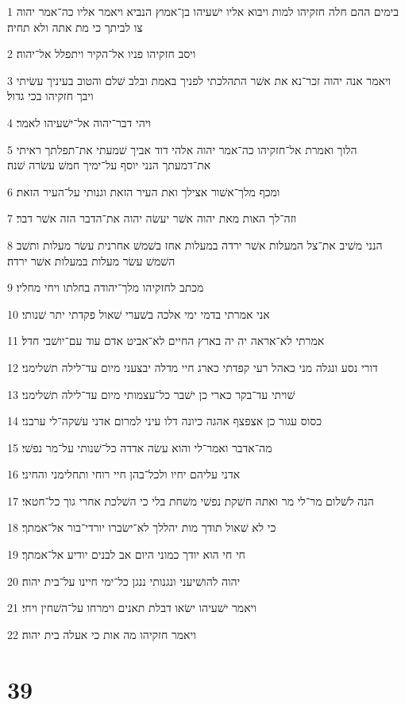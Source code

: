 \par 1 בימים ההם חלה חזקיהו למות ויבוא אליו ישׁעיהו בן־אמוץ הנביא ויאמר אליו כה־אמר יהוה צו לביתך כי מת אתה ולא תחיה׃
\par 2 ויסב חזקיהו פניו אל־הקיר ויתפלל אל־יהוה׃
\par 3 ויאמר אנה יהוה זכר־נא את אשׁר התהלכתי לפניך באמת ובלב שׁלם והטוב בעיניך עשׂיתי ויבך חזקיהו בכי גדול׃
\par 4 ויהי דבר־יהוה אל־ישׁעיהו לאמר׃
\par 5 הלוך ואמרת אל־חזקיהו כה־אמר יהוה אלהי דוד אביך שׁמעתי את־תפלתך ראיתי את־דמעתך הנני יוסף על־ימיך חמשׁ עשׂרה שׁנה׃
\par 6 ומכף מלך־אשׁור אצילך ואת העיר הזאת וגנותי על־העיר הזאת׃
\par 7 וזה־לך האות מאת יהוה אשׁר יעשׂה יהוה את־הדבר הזה אשׁר דבר׃
\par 8 הנני משׁיב את־צל המעלות אשׁר ירדה במעלות אחז בשׁמשׁ אחרנית עשׂר מעלות ותשׁב השׁמשׁ עשׂר מעלות במעלות אשׁר ירדה׃
\par 9 מכתב לחזקיהו מלך־יהודה בחלתו ויחי מחליו׃
\par 10 אני אמרתי בדמי ימי אלכה בשׁערי שׁאול פקדתי יתר שׁנותי׃
\par 11 אמרתי לא־אראה יה יה בארץ החיים לא־אביט אדם עוד עם־יושׁבי חדל׃
\par 12 דורי נסע ונגלה מני כאהל רעי קפדתי כארג חיי מדלה יבצעני מיום עד־לילה תשׁלימני׃
\par 13 שׁויתי עד־בקר כארי כן ישׁבר כל־עצמותי מיום עד־לילה תשׁלימני׃
\par 14 כסוס עגור כן אצפצף אהגה כיונה דלו עיני למרום אדני עשׁקה־לי ערבני׃
\par 15 מה־אדבר ואמר־לי והוא עשׂה אדדה כל־שׁנותי על־מר נפשׁי׃
\par 16 אדני עליהם יחיו ולכל־בהן חיי רוחי ותחלימני והחיני׃
\par 17 הנה לשׁלום מר־לי מר ואתה חשׁקת נפשׁי משׁחת בלי כי השׁלכת אחרי גוך כל־חטאי׃
\par 18 כי לא שׁאול תודך מות יהללך לא־ישׂברו יורדי־בור אל־אמתך׃
\par 19 חי חי הוא יודך כמוני היום אב לבנים יודיע אל־אמתך׃
\par 20 יהוה להושׁיעני ונגנותי ננגן כל־ימי חיינו על־בית יהוה׃
\par 21 ויאמר ישׁעיהו ישׂאו דבלת תאנים וימרחו על־השׁחין ויחי׃
\par 22 ויאמר חזקיהו מה אות כי אעלה בית יהוה׃

\chapter{39}

